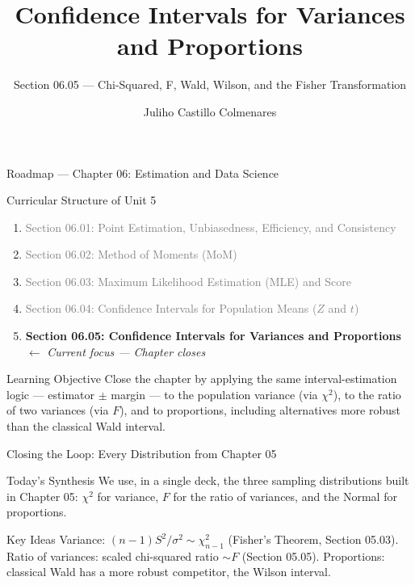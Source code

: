 \documentclass[aspectratio=169,xcolor={dvipsnames,table}]{beamer}
\title{Confidence Intervals for Variances and Proportions}
\subtitle{Section 06.05 --- Chi-Squared, F, Wald, Wilson, and the Fisher Transformation}
\author[J. Castillo Colmenares]{Juliho Castillo Colmenares}
\institute[Tec de Monterrey]{Tecnologico de Monterrey}
\date{\vspace{-1.5cm}}
\begin{document}
\begin{frame}[plain]
	\titlepage
\end{frame}

\begin{frame}{Roadmap --- Chapter 06: Estimation and Data Science}
	\vspace{-0.15cm}
	\begin{block}{Curricular Structure of Unit 5}
		\footnotesize
		\begin{enumerate}\itemsep=0.03cm
			\item \textcolor{gray}{Section 06.01: Point Estimation, Unbiasedness, Efficiency, and Consistency}
			\item \textcolor{gray}{Section 06.02: Method of Moments (MoM)}
			\item \textcolor{gray}{Section 06.03: Maximum Likelihood Estimation (MLE) and Score}
			\item \textcolor{gray}{Section 06.04: Confidence Intervals for Population Means ($Z$ and $t$)}
			\item \textbf{\textcolor{TecRojo}{Section 06.05: Confidence Intervals for Variances and Proportions}} $\leftarrow$ \emph{Current focus --- Chapter closes}
		\end{enumerate}
	\end{block}
	\vspace{-0.2cm}
	\begin{alertblock}{Learning Objective}
		\scriptsize
		Close the chapter by applying the same interval-estimation logic --- estimator $\pm$ margin --- to the population variance (via $\chi^2$), to the ratio of two variances (via $F$), and to proportions, including alternatives more robust than the classical Wald interval.
	\end{alertblock}
\end{frame}

\begin{frame}{Closing the Loop: Every Distribution from Chapter 05}
	\vspace{-0.15cm}
	\begin{block}{Today's Synthesis}
		\footnotesize
		We use, in a single deck, the three sampling distributions built in Chapter 05: $\chi^2$ for variance, $F$ for the ratio of variances, and the Normal for proportions.
	\end{block}
	\pause
	\vspace{0.1cm}
	\begin{alertblock}{Key Ideas}
		\footnotesize
		Variance: $(n-1)S^2/\sigma^2 \sim \chi^2_{n-1}$ (Fisher's Theorem, Section 05.03). Ratio of variances: scaled chi-squared ratio $\sim F$ (Section 05.05). Proportions: classical Wald has a more robust competitor, the Wilson interval.
	\end{alertblock}
\end{frame}
\end{document}
